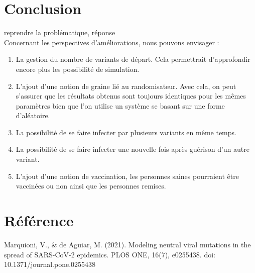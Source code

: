 \documentclass{article}
\begin{document}
\section{Conclusion}

reprendre la problématique, réponse\\

Concernant les perspectives d'améliorations, nous pouvons envisager :
\begin{enumerate}
    \item La gestion du nombre de variants de départ. Cela permettrait d'approfondir encore plus les possibilité de simulation. 
    \item L'ajout d'une notion de graine lié au randomisateur. Avec cela, on peut s'assurer que les résultats obtenus sont toujours identiques pour les mêmes paramètres bien que l'on utilise un système se basant sur une forme d'aléatoire. 
    \item La possibilité de se faire infecter par plusieurs variants en même temps. 
    \item La possibilité de se faire infecter une nouvelle fois après guérison d'un autre variant. 
    \item L'ajout d'une notion de vaccination, les personnes saines pourraient être vaccinées ou non ainsi que les personnes remises. 
\end{enumerate}

\section{Référence}

Marquioni, V., & de Aguiar, M. (2021). Modeling neutral viral mutations in the spread of SARS-CoV-2 epidemics. PLOS ONE, 16(7), e0255438. doi: 10.1371/journal.pone.0255438
\end{document}
